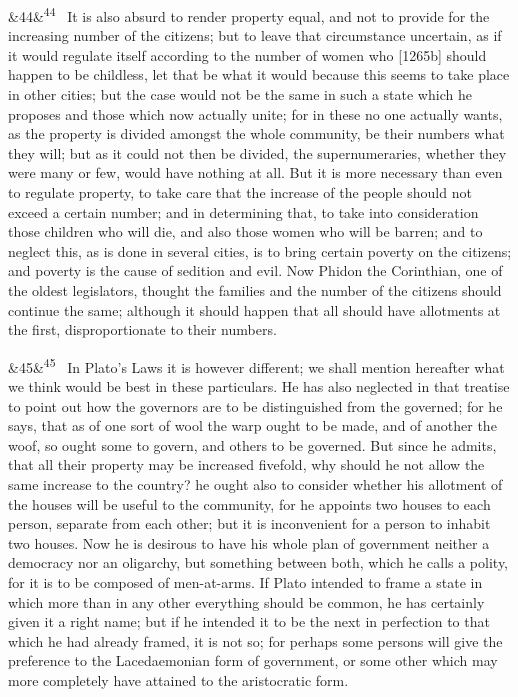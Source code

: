\documentclass[12pt]{article}
\newcommand{\para}[1][]{\par\noindent\ifx&#1&\else\textsuperscript{\footnotesize #1}~\fi}
\begin{document}
\para[44] It is also absurd to render property equal, and not to provide for the increasing number of the citizens; but to leave that circumstance uncertain, as if it would regulate itself according to the number of women who [1265b] should happen to be childless, let that be what it would because this seems to take place in other cities; but the case would not be the same in such a state which he proposes and those which now actually unite; for in these no one actually wants, as the property is divided amongst the whole community, be their numbers what they will; but as it could not then be divided, the supernumeraries, whether they were many or few, would have nothing at all. But it is more necessary than even to regulate property, to take care that the increase of the people should not exceed a certain number; and in determining that, to take into consideration those children who will die, and also those women who will be barren; and to neglect this, as is done in several cities, is to bring certain poverty on the citizens; and poverty is the cause of sedition and evil. Now Phidon the Corinthian, one of the oldest legislators, thought the families and the number of the citizens should continue the same; although it should happen that all should have allotments at the first, disproportionate to their numbers.

\para[45] In Plato's Laws it is however different; we shall mention hereafter what we think would be best in these particulars. He has also neglected in that treatise to point out how the governors are to be distinguished from the governed; for he says, that as of one sort of wool the warp ought to be made, and of another the woof, so ought some to govern, and others to be governed. But since he admits, that all their property may be increased fivefold, why should he not allow the same increase to the country? he ought also to consider whether his allotment of the houses will be useful to the community, for he appoints two houses to each person, separate from each other; but it is inconvenient for a person to inhabit two houses. Now he is desirous to have his whole plan of government neither a democracy nor an oligarchy, but something between both, which he calls a polity, for it is to be composed of men-at-arms. If Plato intended to frame a state in which more than in any other everything should be common, he has certainly given it a right name; but if he intended it to be the next in perfection to that which he had already framed, it is not so; for perhaps some persons will give the preference to the Lacedaemonian form of government, or some other which may more completely have attained to the aristocratic form.
\end{document}
